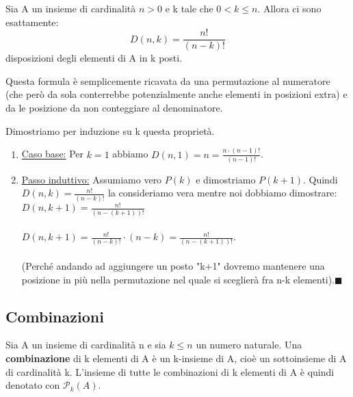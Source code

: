 \begin{proposition}
Sia A un insieme di cardinalità $n > 0$ e k tale che $0 < k \leq n$. Allora ci sono esattamente:
\begin{equation}
    D(n,k) = \frac{\displaystyle n!}{\displaystyle (n - k)!}
\end{equation}
disposizioni degli elementi di A in k posti.
\end{proposition}
\hspace{-15pt}Questa formula è semplicemente ricavata da una permutazione al numeratore (che però da sola conterrebbe potenzialmente anche elementi in posizioni extra) e da le posizione da non conteggiare al denominatore.

\begin{demostration}
    Dimostriamo per induzione su k questa proprietà.
    \begin{enumerate}
        \item \underline{Caso base:} Per $k=1$ abbiamo $D(n,1) = n = \frac{\displaystyle n \cdot (n - 1)!}{\displaystyle (n - 1)!}$.
        \item \underline{Passo induttivo:} Assumiamo vero $P(k)$ e dimostriamo $P(k+1)$. Quindi $D(n,k) = \frac{\displaystyle n!}{\displaystyle (n - k)!}$ la consideriamo vera mentre noi dobbiamo dimostrare: $D(n,k+1) = \frac{\displaystyle n!}{\displaystyle (n - (k + 1))!}$\\\\
        $D(n,k+1) = \frac{\displaystyle n!}{\displaystyle (n - k)!} \cdot (n-k) = \frac{\displaystyle n!}{\displaystyle (n - (k + 1))!}$. \\\\
        (Perché andando ad aggiungere un posto "k+1" dovremo mantenere una posizione in più nella permutazione nel quale si sceglierà fra n-k elementi).$\blacksquare$
    \end{enumerate}
\end{demostration}

\subsection{Combinazioni}
\begin{definition}[Combinazioni]
    Sia A un insieme di cardinalità n e sia $k \leq n$ un numero naturale. Una \textbf{combinazione} di k elementi di A è un k-insieme di A, cioè un sottoinsieme di A di cardinalità k. L'insieme di tutte le combinazioni di k elementi di A è quindi denotato con $\mathcal{P}_k(A).$
\end{definition}

